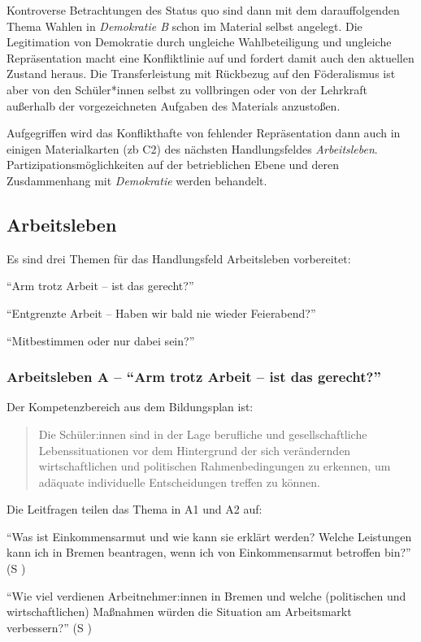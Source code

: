Kontroverse Betrachtungen des Status quo sind dann mit dem darauffolgenden Thema Wahlen in \emph{Demokratie B} schon im Material selbst angelegt. Die Legitimation von Demokratie durch ungleiche Wahlbeteiligung und ungleiche Repräsentation macht eine Konfliktlinie auf und fordert damit auch den aktuellen Zustand heraus. Die Transferleistung mit Rückbezug auf den Föderalismus ist aber von den Schüler*innen selbst zu vollbringen oder von der Lehrkraft außerhalb der vorgezeichneten Aufgaben des Materials anzustoßen. 

Aufgegriffen wird das Konflikthafte von fehlender Repräsentation dann auch in einigen Materialkarten (\gls{zb} C2) des nächsten Handlungsfeldes \emph{Arbeitsleben}. Partizipationsmöglichkeiten auf der betrieblichen Ebene und deren Zusdammenhang mit \emph{Demokratie} werden behandelt. 



\subsection{Arbeitsleben}
Es sind drei Themen für das Handlungsfeld Arbeitsleben vorbereitet:
\begin{myenumerate}
    \item \enquote{Arm trotz Arbeit – ist das gerecht?}
    \item \enquote{Entgrenzte Arbeit – Haben wir bald nie wieder Feierabend?}
    \item \enquote{Mitbestimmen oder nur dabei sein?}
\end{myenumerate}



\subsubsection{Arbeitsleben A -- \enquote{Arm trotz Arbeit – ist das gerecht?}}
Der Kompetenzbereich aus dem Bildungsplan ist: 
\begin{quotation}
    Die Schüler:innen sind in der Lage berufliche und gesellschaftliche Lebenssituationen vor dem Hintergrund der sich verändernden wirtschaftlichen und politischen Rahmenbedingungen zu erkennen, um adäquate individuelle Entscheidungen treffen zu können.

    \autocite[18]{bplan}
\end{quotation}

Die Leitfragen teilen das Thema in A1 und A2 auf: 
\begin{myenumerate}
    \item \enquote{Was ist Einkommensarmut und wie kann sie erklärt werden? Welche Leistungen kann ich in Bremen beantragen, wenn ich von Einkommensarmut betroffen bin?} (\gls{S} \pageref{ARBEITSLEBEN-A1})
    \item \enquote{Wie viel verdienen Arbeitnehmer:innen in Bremen und welche (politischen und wirtschaftlichen) Maßnahmen würden die Situation am Arbeitsmarkt verbessern?}  (\gls{S} \pageref{ARBEITSLEBEN-A2})
\end{myenumerate}

